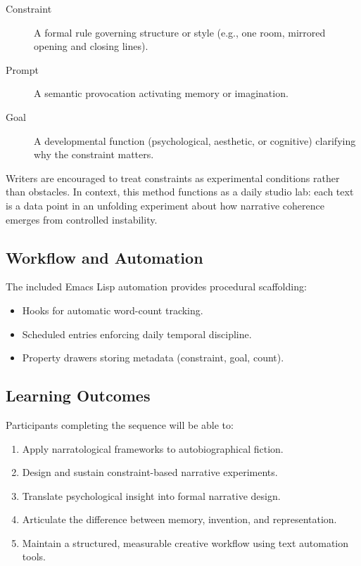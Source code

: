 \documentclass[11pt]{article}
\begin{document}
\begin{description}
\item[{Constraint}] A formal rule governing structure or style (e.g., one room, mirrored opening and closing lines).
\item[{Prompt}] A semantic provocation activating memory or imagination.
\item[{Goal}] A developmental function (psychological, aesthetic, or cognitive) clarifying why the constraint matters.
\end{description}

Writers are encouraged to treat constraints as experimental conditions rather than obstacles. In context, this method functions as a daily studio lab: each text is a data point in an unfolding experiment about how narrative coherence emerges from controlled instability.
\subsection*{Workflow and Automation}
\label{sec:orgc7df42a}

The included Emacs Lisp automation provides procedural scaffolding:

\begin{itemize}
\item Hooks for automatic word-count tracking.
\item Scheduled entries enforcing daily temporal discipline.
\item Property drawers storing metadata (constraint, goal, count).
\end{itemize}
\subsection*{Learning Outcomes}
\label{sec:org0d1ec9f}

Participants completing the sequence will be able to:

\begin{enumerate}
\item Apply narratological frameworks to autobiographical fiction.
\item Design and sustain constraint-based narrative experiments.
\item Translate psychological insight into formal narrative design.
\item Articulate the difference between memory, invention, and representation.
\item Maintain a structured, measurable creative workflow using text automation tools.
\end{enumerate}
\end{document}
